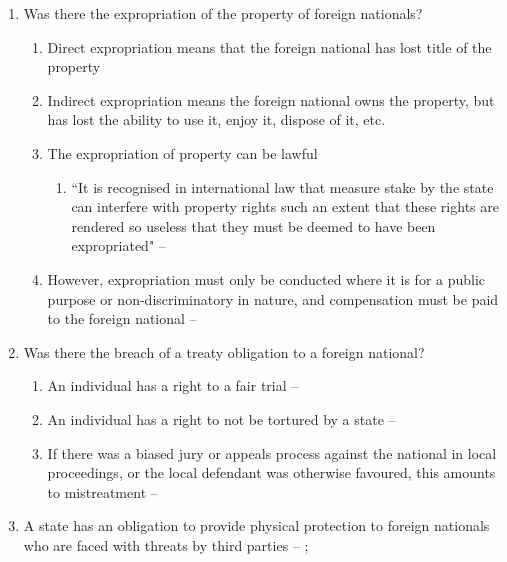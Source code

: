 \begin{enumerate}
\begin{enumerate}
        \item Was there the expropriation of the property of foreign nationals?
        \begin{enumerate}
            \item Direct expropriation means that the foreign national has lost title of the property
            \item Indirect expropriation means the foreign national owns the property, but has lost the ability to use it, enjoy it, dispose of it, etc.
            \item The expropriation of property can be lawful
            \begin{enumerate}
                \item ``It is recognised in international law that measure stake by the state can interfere with property rights such an extent that these rights are rendered so useless that they must be deemed to have been expropriated" -- 
            \end{enumerate}
            \item However, expropriation must only be conducted where it is for a public purpose or non-discriminatory in nature, and compensation must be paid to the foreign national -- 
        \end{enumerate}
        \item Was there the breach of a treaty obligation to a foreign national?
        \begin{enumerate}
            \item An individual has a right to a fair trial -- 
            \item An individual has a right to not be tortured by a state -- 
            \item If there was a biased jury or appeals process against the national in local proceedings, or the local defendant was otherwise favoured, this amounts to mistreatment -- 
        \end{enumerate}
        \item A state has an obligation to provide physical protection to foreign nationals who are faced with threats by third parties -- ; 

\end{enumerate}
\end{enumerate}
